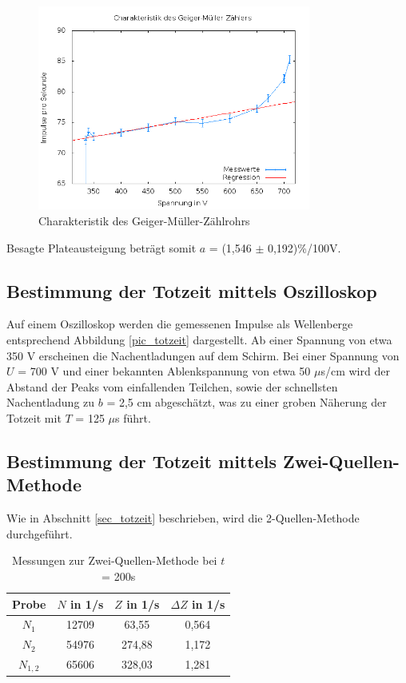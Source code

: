 \begin{figure}[H]
 \includegraphics[width=0.8\textwidth]{pics/charakteristik.png}
 \caption{Charakteristik des Geiger-Müller-Zählrohrs}
 \label{pic_plateau}
\end{figure}
Besagte Plateausteigung beträgt somit $a$ = (1,546 $\pm$ 0,192)\%/100V.  

\subsection{Bestimmung der Totzeit mittels Oszilloskop}
Auf einem Oszilloskop werden die gemessenen Impulse als Wellenberge entsprechend Abbildung \ref{pic_totzeit} dargestellt. Ab einer
Spannung von etwa 350 V erscheinen die Nachentladungen auf dem Schirm. Bei einer Spannung von $U$ = 700 V und einer bekannten
Ablenkspannung von etwa 50 $\mu$s/cm wird der Abstand der Peaks vom einfallenden Teilchen, sowie der schnellsten Nachentladung zu 
$b$ = 2,5 cm abgeschätzt, was zu einer groben Näherung der Totzeit mit $T$ = 125 $\mu$s führt.

\subsection{Bestimmung der Totzeit mittels Zwei-Quellen-Methode}
Wie in Abschnitt \ref{sec_totzeit} beschrieben, wird die 2-Quellen-Methode durchgeführt. 

\begin{table}[H]
 \begin{tabular}{c|c|c|c}
Probe & $N$ in 1/s & $Z$ in 1/s & $\Delta Z$ in 1/s \\
\hline
$N_1$		& 12709 	& 63,55 	& 0,564\\
$N_2$ 		& 54976 	& 274,88 	& 1,172\\
$N_{1,2}$ 	& 65606 	& 328,03	& 1,281
  
 \end{tabular}
\caption{Messungen zur Zwei-Quellen-Methode bei $t$ = 200s}
\label{tab_2quellen}
\end{table}

